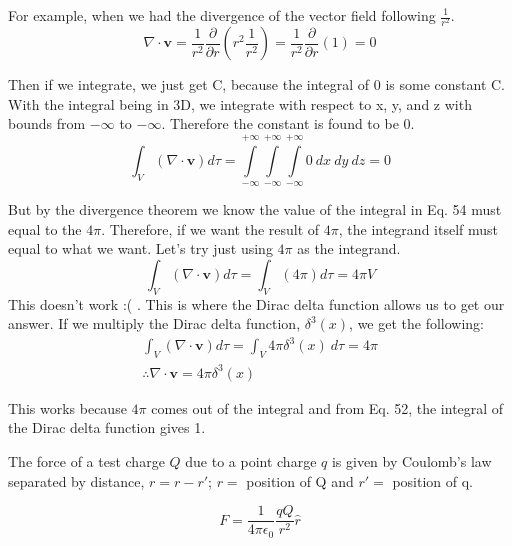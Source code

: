  For example, when we had the divergence of the vector field following \( \frac{1}{r^2} \). 
\begin{equation}
\nabla{} \cdot \mathbf{v} = \frac{1}{r^2}\frac{\partial{}}{\partial{r}} (r^2\frac{1}{r^2})  =  \frac{1}{r^2}\frac{\partial{}}{\partial{r}} (1) = 0
\end{equation}
 
 Then if we integrate, we just get C, because the integral of 0 is some constant C. With the integral being in 3D, we integrate with respect to x, y, and z with bounds from \( -\infty \) to \( -\infty \). Therefore the constant is found to be 0.
 \begin{equation}
 \int_V (\nabla{} \cdot \mathbf{v})d\tau = \int\limits_{-\infty}^{+\infty}\int\limits_{-\infty}^{+\infty}\int\limits_{-\infty}^{+\infty} 0\ dx\ dy\ dz = 0
 \end{equation}
 
 But by the divergence theorem we know the value of the integral in Eq. 54 must equal to the \( 4\pi \). Therefore, if we want the result of \( 4\pi \), the integrand itself must equal to what we want. Let's try just using \( 4\pi \) as the integrand. 
 \begin{equation}
 \int_V (\nabla{} \cdot \mathbf{v})d\tau = \int_V (4\pi)d\tau =4\pi V
 \end{equation}
  This doesn't work :( . This is where the Dirac delta function allows us to get our answer. If we multiply the Dirac delta function, \( \delta^3(x) \), we get the following:
  \begin{equation}
  \begin{gathered}
  \int_V (\nabla{} \cdot \mathbf{v})d\tau = \int_V 4\pi \delta^3(x)\ d\tau =4\pi \\
  \therefore \nabla{} \cdot \mathbf{v} = 4\pi \delta^3(x)
  \end{gathered}
  \end{equation}
  
This works because \( 4\pi \) comes out of the integral and from Eq. 52, the integral of the Dirac delta function gives 1. 
  \newpage
{}

The force of a test charge \( Q \) due to a point charge \( q \) is given by Coulomb's law separated by distance, \( r = r - r' \); \( r = \) position of Q and \( r'= \) position of q.

\begin{equation}
\boxed{F=\frac{1}{4\pi\epsilon_0}\frac{qQ}{r^2}\hat{r}}
\end{equation}

